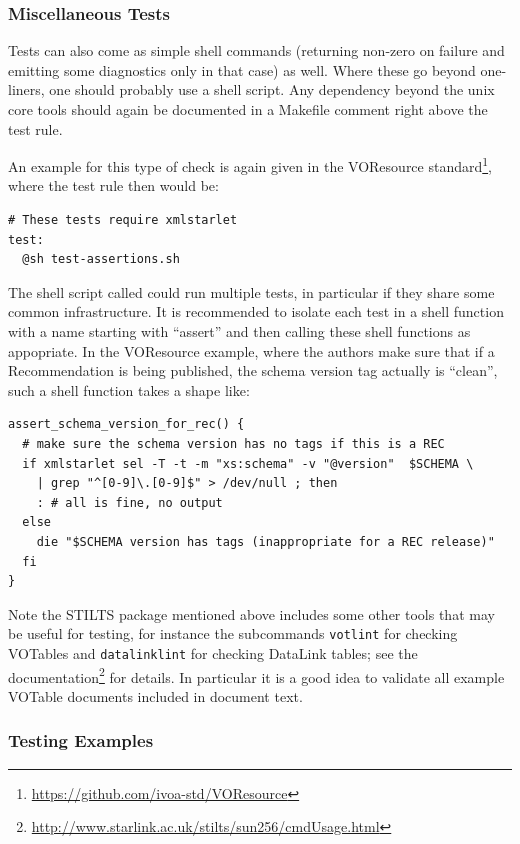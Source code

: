 \documentclass[11pt,a4paper]{ivoa}
\begin{document}
\subsubsection{Miscellaneous Tests}

Tests can also come as simple shell commands (returning non-zero on
failure and emitting some diagnostics only in that case) as well.  Where
these go beyond one-liners, one should probably use a shell script.
Any dependency beyond the unix core tools should again be documented in
a Makefile comment right above the test rule.

An example for this type of check is again given in the VOResource
standard\footnote{\url{https://github.com/ivoa-std/VOResource}}, where
the test rule then would be:

\begin{lstlisting}[basicstyle=\footnotesize]
# These tests require xmlstarlet
test:
  @sh test-assertions.sh
\end{lstlisting}

The shell script called could run multiple tests, in particular if they
share some common infrastructure.  It is recommended to isolate each
test in a shell function with a name starting with ``assert'' and then
calling these shell functions as appopriate.  In the VOResource example,
where the authors make sure that if a Recommendation is being published,
the schema version tag actually is ``clean'', such a shell function
takes a shape like:

\begin{lstlisting}[basicstyle=\footnotesize]
assert_schema_version_for_rec() {
  # make sure the schema version has no tags if this is a REC
  if xmlstarlet sel -T -t -m "xs:schema" -v "@version"  $SCHEMA \
    | grep "^[0-9]\.[0-9]$" > /dev/null ; then
    : # all is fine, no output
  else
    die "$SCHEMA version has tags (inappropriate for a REC release)"
  fi
}
\end{lstlisting}

Note the STILTS package mentioned above includes some other tools
that may be useful for testing, for instance the subcommands
\verb|votlint| for checking VOTables and \verb|datalinklint| for
checking DataLink tables; see the
documentation\footnote{\url{http://www.starlink.ac.uk/stilts/sun256/cmdUsage.html}}
for details.
In particular it is a good idea to validate all example VOTable documents
included in document text.

\subsubsection{Testing Examples}
\end{document}
